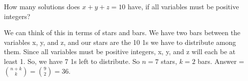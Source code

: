 \question How many solutions does $x + y + z = 10$ have, if all variables 
must be positive integers? 

\begin{solution}[.5 in]
We can think of this in terms of stars and bars. We have two bars between the variables x, y, and z, and our stars are the 10 1s we have to distribute among them. Since all variables must be positive integers, x, y, and z will each be at least 1. So, we have 7 1s left to distribute. So $n = 7$ stars, $k = 2$ bars. Answer = ${n+k \choose k} = {9 \choose 2} = 36$.
\end{solution}